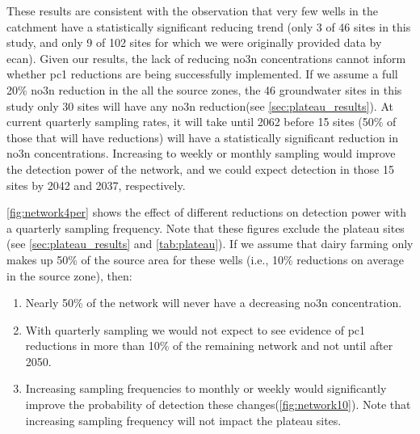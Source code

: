These results are consistent with the observation that very few wells in the catchment have a statistically significant reducing trend (only 3 of 46 sites in this study, and only 9 of 102 sites for which we were originally provided data by \gls{ecan}).
Given our results, the lack of reducing \gls{no3n} concentrations cannot inform whether \gls{pc1} reductions are being successfully implemented.
If we assume a full 20\% \gls{no3n} reduction in the all the source zones, the 46 groundwater sites in this study only 30 sites will have any \gls{no3n} reduction(see \autoref{sec:plateau_results}).
At current quarterly sampling rates, it will take until 2062 before 15 sites (50\% of those that will have reductions) will have a statistically significant reduction in \gls{no3n} concentrations.
Increasing to weekly or monthly sampling would improve the detection power of the network, and we could expect detection in those 15 sites by 2042 and 2037, respectively.

\begin{landscape}




\end{landscape}

\autoref{fig:network4per} shows the effect of different reductions on detection power with a quarterly sampling frequency.
Note that these figures exclude the plateau sites (see \autoref{sec:plateau_results} and \autoref{tab:plateau}).
If we assume that dairy farming only makes up 50\% of the source area for these wells (i.e., 10\% reductions on average in the source zone), then:
\begin{enumerate}
    \item Nearly 50\% of the network will never have a decreasing \gls{no3n} concentration.
    \item With quarterly sampling we would not expect to see evidence of \gls{pc1} reductions in more than 10\% of the remaining network and not until after 2050.
    \item Increasing sampling frequencies to monthly or weekly would significantly improve the probability of detection these changes(\autoref{fig:network10}). Note that increasing sampling frequency will not impact the plateau sites.
\end{enumerate}

